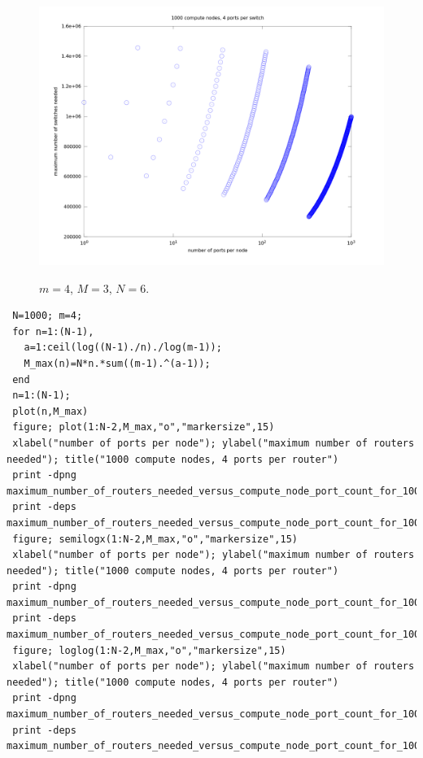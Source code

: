 \documentclass[pdftex]{article}
\begin{document}
\begin{figure}[h!]
\begin{center}
\includegraphics[scale=.3]{pictures/maximum_number_of_routers_needed_versus_compute_node_port_count_for_1000_compute_nodes_and_4_ports_per_router_semilogx}
\label{fig:max}
 \caption{$m=4$, $M=3$, $N=6$.}
\end{center}
\end{figure}
\begin{verbatim}
 N=1000; m=4; 
 for n=1:(N-1),
   a=1:ceil(log((N-1)./n)./log(m-1));
   M_max(n)=N*n.*sum((m-1).^(a-1));
 end
 n=1:(N-1);
 plot(n,M_max)
 figure; plot(1:N-2,M_max,"o","markersize",15)
 xlabel("number of ports per node"); ylabel("maximum number of routers needed"); title("1000 compute nodes, 4 ports per router")
 print -dpng maximum_number_of_routers_needed_versus_compute_node_port_count_for_1000_compute_nodes_and_4_ports_per_router.png
 print -deps maximum_number_of_routers_needed_versus_compute_node_port_count_for_1000_compute_nodes_and_4_ports_per_router.eps
 figure; semilogx(1:N-2,M_max,"o","markersize",15)
 xlabel("number of ports per node"); ylabel("maximum number of routers needed"); title("1000 compute nodes, 4 ports per router")
 print -dpng maximum_number_of_routers_needed_versus_compute_node_port_count_for_1000_compute_nodes_and_4_ports_per_router_semilogx.png
 print -deps maximum_number_of_routers_needed_versus_compute_node_port_count_for_1000_compute_nodes_and_4_ports_per_router_semilogx.eps
 figure; loglog(1:N-2,M_max,"o","markersize",15)
 xlabel("number of ports per node"); ylabel("maximum number of routers needed"); title("1000 compute nodes, 4 ports per router")
 print -dpng maximum_number_of_routers_needed_versus_compute_node_port_count_for_1000_compute_nodes_and_4_ports_per_router_loglog.png
 print -deps maximum_number_of_routers_needed_versus_compute_node_port_count_for_1000_compute_nodes_and_4_ports_per_router_loglog.eps
\end{verbatim}
 
\end{document}
